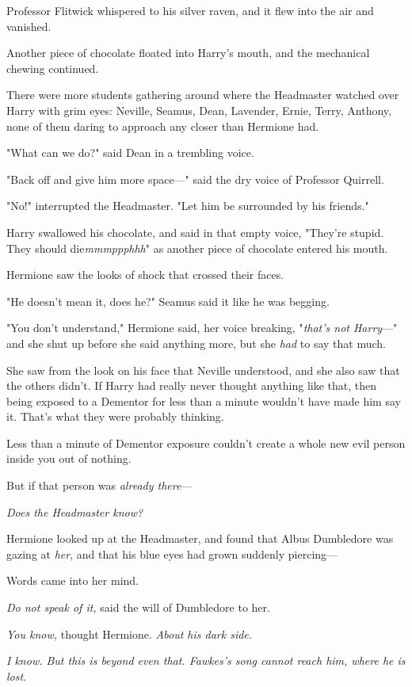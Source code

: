 Professor Flitwick whispered to his silver raven, and it flew into the air and
vanished.

Another piece of chocolate floated into Harry's mouth, and the mechanical
chewing continued.

There were more students gathering around where the Headmaster watched over
Harry with grim eyes: Neville, Seamus, Dean, Lavender, Ernie, Terry, Anthony,
none of them daring to approach any closer than Hermione had.

"What can we do?" said Dean in a trembling voice.

"Back off and give him more space—" said the dry voice of Professor Quirrell.

"No!" interrupted the Headmaster. "Let him be surrounded by his friends."

Harry swallowed his chocolate, and said in that empty voice, "They're stupid.
They should die\emph{mmmppphhh}" as another piece of chocolate entered his
mouth.

Hermione saw the looks of shock that crossed their faces.

"He doesn't mean it, does he?" Seamus said it like he was begging.

"You don't understand," Hermione said, her voice breaking, "\emph{that's not
Harry}—" and she shut up before she said anything more, but she \emph{had} to
say that much.

She saw from the look on his face that Neville understood, and she also saw
that the others didn't. If Harry had really never thought anything like that,
then being exposed to a Dementor for less than a minute wouldn't have made him
say it. That's what they were probably thinking.

Less than a minute of Dementor exposure couldn't create a whole new evil person
inside you out of nothing.

But if that person was \emph{already there}—

\emph{Does the Headmaster know?}

Hermione looked up at the Headmaster, and found that Albus Dumbledore was
gazing at \emph{her}, and that his blue eyes had grown suddenly piercing—

Words came into her mind.

\emph{Do not speak of it,} said the will of Dumbledore to her.

\emph{You know,} thought Hermione. \emph{About his dark side.}

\emph{I know. But this is beyond even that. Fawkes's song cannot reach him,
where he is lost.}

